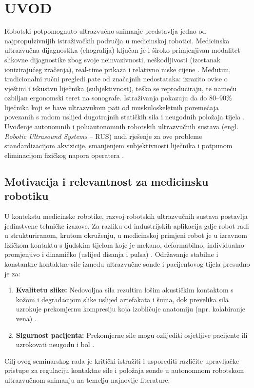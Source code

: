 
\section{UVOD}
\label{sec:uvod}

Robotski potpomognuto ultrazvučno snimanje predstavlja jedno od najpropulzivnijih istraživačkih područja u medicinskoj robotici. Medicinska ultrazvučna dijagnostika (ehografija) ključan je i široko primjenjivan modalitet slikovne dijagnostike zbog svoje neinvazivnosti, neškodljivosti (izostanak ionizirajućeg zračenja), real-time prikaza i relativno niske cijene \cite{jiang2023robotic, vonhaxthausen2021medical}. Međutim, tradicionalni ručni pregledi pate od značajnih nedostataka: izrazito ovise o vještini i iskustvu liječnika (subjektivnost), teško se reproduciraju, te nameću ozbiljan ergonomski teret na sonografe. Istraživanja pokazuju da do 80--90\% liječnika koji se bave ultrazvukom pati od muskuloskeletnih poremećaja povezanih s radom uslijed dugotrajnih statičkih sila i neugodnih položaja tijela \cite{ulrich2021probe}. Uvođenje autonomnih i poluautonomnih robotskih ultrazvučnih sustava (engl. \textit{Robotic Ultrasound Systems} -- RUS) nudi rješenje za ove probleme standardizacijom akvizicije, smanjenjem subjektivnosti liječnika i potpunom eliminacijom fizičkog napora operatera \cite{qin2026review, ieee2025survey}.

\subsection{Motivacija i relevantnost za medicinsku robotiku}
U kontekstu medicinske robotike, razvoj robotskih ultrazvučnih sustava postavlja jedinstvene tehničke izazove. Za razliku od industrijskih aplikacija gdje robot radi u strukturiranom, krutom okruženju, u medicinskoj primjeni robot je u izravnom fizičkom kontaktu s ljudskim tijelom koje je mekano, deformabilno, individualno promjenjivo i dinamičko (uslijed disanja i pulsa) \cite{jiang2024force}. Održavanje stabilne i konstantne kontaktne sile između ultrazvučne sonde i pacijentovog tijela presudno je za:
\begin{enumerate}
    \item \textbf{Kvalitetu slike:} Nedovoljna sila rezultira lošim akustičkim kontaktom s kožom i degradacijom slike uslijed artefakata i šuma, dok prevelika sila uzrokuje prekomjernu kompresiju koja izobličuje anatomiju (npr. kolabiranje vena) \cite{akbari2021robotic}.
    \item \textbf{Sigurnost pacijenta:} Prekomjerne sile mogu ozlijediti osjetljive pacijente ili uzrokovati neugodu i bol \cite{ulrich2021probe, ieee2025haptic}.
\end{enumerate}
Cilj ovog seminarskog rada je kritički istražiti i usporediti različite upravljačke pristupe za regulaciju kontaktne sile i položaja sonde u autonomnom robotskom ultrazvučnom snimanju na temelju najnovije literature.

